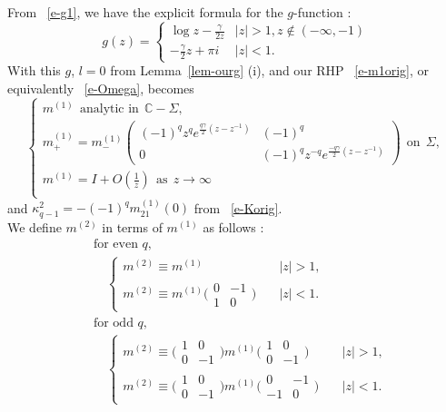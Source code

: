 \documentclass{amsart}
\theoremstyle{definition}
\theoremstyle{remark}
\numberwithin{equation}{section}
\newcommand{\C}{\mathbb C}
\begin{document}
From ~\eqref{e-g1}, we have the explicit formula for the $g$-function :
\begin{equation*}  g(z)=
    \begin{cases}
      \log{z}-\frac{\gamma}{2z}& |z|>1, z\notin (-\infty,-1)\\
      -\frac{\gamma}2 z+\pi i& |z|<1.
    \end{cases}
\end{equation*}
With this $g$, $l=0$ from Lemma~\ref{lem-ourg} (i), and our 
RHP ~\eqref{e-m1orig},  
or equivalently ~\eqref{e-Omega}, becomes
\begin{equation}
\begin{cases}
m^{(1)} \ \ \text{analytic in} \ \ \C-\Sigma,\\
m_+^{(1)}= m_-^{(1)} \begin{pmatrix} (-1)^qz^qe^{\frac{q\gamma}{2}(z-z^{-1})}& (-1)^q\\
                              0& (-1)^qz^{-q}e^{\frac{-q\gamma}{2}(z-z^{-1})}
              \end{pmatrix} \ \ \text{on} \ \  \Sigma,\\
m^{(1)}=I+O(\frac1z) \ \ \text{as} \ \  z\rightarrow \infty\\
\end{cases}
\end{equation}
and $\kappa^2_{q-1}=-(-1)^qm_{21}^{(1)}(0)$ from ~\eqref{e-Korig}.\\
We define $m^{(2)}$ in terms of $m^{(1)}$ as follows :
\begin{equation}\label{e-conju}
 \begin{split}
  &\text{for even $q$,} \\
  &\quad \begin{cases}
    m^{(2)} \equiv m^{(1)}& \quad |z|>1,\\ 
    m^{(2)} \equiv m^{(1)} \bigl( \begin{smallmatrix} 0& -1\\ 1&0 
\end{smallmatrix} \bigr)& \quad |z|<1. \end{cases}\\
  &\text{for odd $q$,}\\
  &\quad\begin{cases}
    m^{(2)} \equiv \bigl( \begin{smallmatrix} 1&0\\0&-1 
\end{smallmatrix} \bigr)  m^{(1)} \bigl( 
\begin{smallmatrix} 1&0\\0&-1 \end{smallmatrix} \bigr)& \quad |z|>1,\\
    m^{(2)} \equiv \bigl( \begin{smallmatrix} 1&0\\0&-1 
\end{smallmatrix} \bigr) m^{(1)} \bigl( 
\begin{smallmatrix} 0&-1\\-1&0 \end{smallmatrix} \bigr)& 
\quad |z|<1. \end{cases}
 \end{split}
\end{equation}
\end{document}
